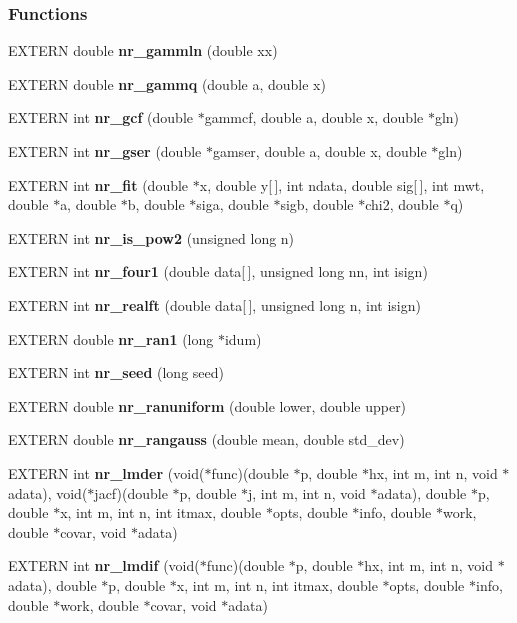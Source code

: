 \subsubsection*{Functions}
\begin{CompactItemize}
\item 
EXTERN double {\bf nr\_\-gammln} (double xx)
\item 
EXTERN double {\bf nr\_\-gammq} (double a, double x)
\item 
EXTERN int {\bf nr\_\-gcf} (double $\ast$gammcf, double a, double x, double $\ast$gln)
\item 
EXTERN int {\bf nr\_\-gser} (double $\ast$gamser, double a, double x, double $\ast$gln)
\item 
EXTERN int {\bf nr\_\-fit} (double $\ast$x, double y[$\,$], int ndata, double sig[$\,$], int mwt, double $\ast$a, double $\ast$b, double $\ast$siga, double $\ast$sigb, double $\ast$chi2, double $\ast$q)
\item 
EXTERN int {\bf nr\_\-is\_\-pow2} (unsigned long n)
\item 
EXTERN int {\bf nr\_\-four1} (double data[$\,$], unsigned long nn, int isign)
\item 
EXTERN int {\bf nr\_\-realft} (double data[$\,$], unsigned long n, int isign)
\item 
EXTERN double {\bf nr\_\-ran1} (long $\ast$idum)
\item 
EXTERN int {\bf nr\_\-seed} (long seed)
\item 
EXTERN double {\bf nr\_\-ranuniform} (double lower, double upper)
\item 
EXTERN double {\bf nr\_\-rangauss} (double mean, double std\_\-dev)
\item 
EXTERN int \textbf{nr\_\-lmder} (void($\ast$func)(double $\ast$p, double $\ast$hx, int m, int n, void $\ast$adata), void($\ast$jacf)(double $\ast$p, double $\ast$j, int m, int n, void $\ast$adata), double $\ast$p, double $\ast$x, int m, int n, int itmax, double $\ast$opts, double $\ast$info, double $\ast$work, double $\ast$covar, void $\ast$adata)\label{group__nr_g59c2090d19b1ad8ed35f50e49539aa0a}

\item 
EXTERN int \textbf{nr\_\-lmdif} (void($\ast$func)(double $\ast$p, double $\ast$hx, int m, int n, void $\ast$adata), double $\ast$p, double $\ast$x, int m, int n, int itmax, double $\ast$opts, double $\ast$info, double $\ast$work, double $\ast$covar, void $\ast$adata)\label{group__nr_g352d4d338f80dc0fe3db4bac7dc9640e}


\end{CompactItemize}

